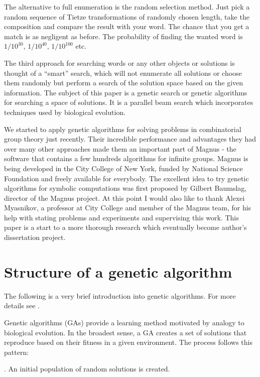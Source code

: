 \documentclass{article}
\begin{document}
The alternative to full enumeration is the random selection
method. Just pick a random sequence of Tietze transformations of
randomly chosen length, take the composition and compare the result
with your word. The chance that you get a match is as negligent as
before. The probability of finding the wanted word is $1/10^{30}$,
$1/10^{40}$, $1/10^{100}$ etc.

The third approach for searching words or any other objects or
solutions is thought of a ``smart'' search, which will not enumerate
all solutions or choose them randomly but perform a search of the
solution space based on the given information. The subject of this
paper is a genetic search or genetic algorithms for searching a space
of solutions. It is a parallel beam search which incorporates
techniques used by biological evolution. 

We started to apply genetic algorithms for solving problems in
combinatorial group theory just recently. Their incredible performance
and advantages they had over many other approaches made them an
important part of Magnus \cite{Magnus} - the software that contains a
few hundreds algorithms for infinite groups. Magnus is being developed
in the City College of New York, funded by National Science Foundation
and freely available for everybody. The excellent idea to try genetic
algorithms for symbolic computations was first proposed by Gilbert
Baumslag, director of the Magnus project. At this point I would also
like to thank Alexei Myasnikov, a professor at City College and member
of the Magnus team, for his help with stating problems and experiments
and supervising this work. This paper is a start to a more thorough
research which eventually become author's dissertation project.


\section{Structure of a genetic algorithm}

The following is a very brief introduction into genetic
algorithms. For more details see \cite{GA1,GA2}. 

Genetic algorithms (GAs) provide a learning method motivated by
analogy to biological evolution. In the broadest sense, a GA creates a
set of solutions that reproduce based on their fitness in a given
environment. The process follows this pattern:

\vspace{3mm}
. An initial population of random solutions is created.
\vspace{3mm}
\end{document}
